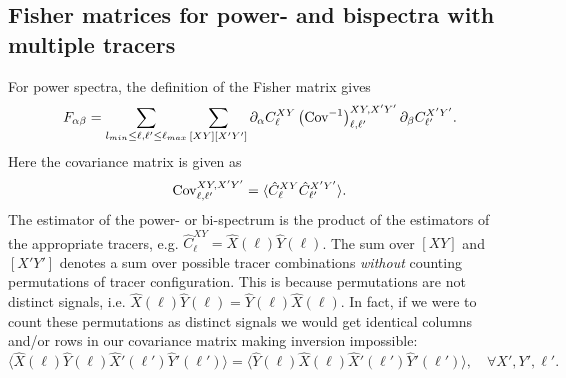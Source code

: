 \documentclass[11pt]{article} %
\DeclareRobustCommand{\Cov}{\ifmmode\text{Cov}\else d\fi}
\newcommand{\br}[1]{\ensuremath{\left( #1 \right)}}
\begin{document}
\subsection{Fisher matrices for power- and bispectra with multiple tracers}
For power spectra, the definition of the Fisher matrix gives 
\begin{equation*}
    F_{\alpha\beta} = \sum_{l_{min}\leq \ell, \ell' \leq \ell_{max}}\sum_{[XY][X'Y']} \partial_\alpha C_{\ell}^{XY} \br{\Cov^{-1}}^{XY, X'Y'}_{\ell, \ell'} \partial_\beta C^{X'Y'}_{\ell'}.
\end{equation*}
Here the covariance matrix is given as
\begin{equation*}
    \Cov^{XY, X'Y'}_{\ell, \ell'} = \langle \hat C^{XY}_{\ell} \hat C^{X'Y'}_{\ell'} \rangle.
\end{equation*}
The estimator of the power- or bi-spectrum is the product of the estimators of the appropriate tracers, e.g. $\hat C^{XY}_{\ell} = \hat X(\ell) \hat Y(\ell)$. The sum over $[XY]$ and $[X'Y']$ denotes a sum over possible tracer combinations \textit{without} counting permutations of tracer configuration. This is because permutations are not distinct signals, i.e. $\hat X(\ell) \hat Y(\ell) = \hat Y(\ell) \hat X(\ell)$. In fact, if we were to count these permutations as distinct signals we would get identical columns and/or rows in our covariance matrix making inversion impossible:
\begin{equation*}
    \langle \hat X(\ell) \hat Y (\ell) \hat X'(\ell') \hat Y' (\ell') \rangle = \langle \hat Y (\ell) \hat X (\ell) \hat X'(\ell') \hat Y' (\ell') \rangle, \quad \forall X', Y', \ell'. 
\end{equation*}
\end{document}
